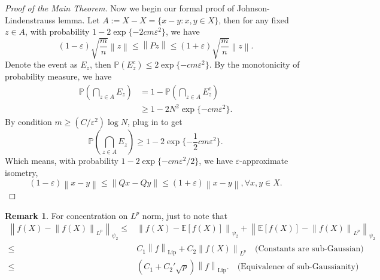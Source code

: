 \documentclass[9pt,onesided]{article}
\newcommand{\nm}[1]{\left\lVert#1\right\rVert}
\newcommand{\ex}[1]{\mathbb{E}[#1]}
\newcommand{\mc}{\color{BlueViolet}}
\renewcommand{\ge}{\geqslant}
\renewcommand{\le}{\leqslant}
\newcommand{\p}{\mathbb{P}}
\theoremstyle{definition}
\newtheorem*{remark}{\mc Remark}
\begin{document}
\begin{proof}
    [Proof of the Main Theorem] Now we begin our formal proof of Johnson-Lindenstrauss lemma. Let $A:= X-X=\{x-y:x,y\in X\}$, then for any fixed $z\in A$, with probability $1-2\exp\{-2cm\varepsilon^2\}$,  we have 
    \begin{equation*}
         (1-\varepsilon)\sqrt{\frac{m}{n}}\nm{z}\le \nm{Pz}\le   (1+\varepsilon)\sqrt{\frac{m}{n}}\nm{z}.
    \end{equation*}
    Denote the event as $E_z$, then $\p(E_z^c)\le2\exp\{-cm\varepsilon^2\}$. By the monotonicity of probability measure, we have
    \begin{align*}
         \p(\bigcap_{z\in A} E_z) &= 1- \p(\bigcap_{z\in A }E_z^c)\\
&\ge 1-2N^2 \exp\{-cm\varepsilon^2\}.
    \end{align*}
    By condition $m\ge (C/\varepsilon^2)\log N$, plug in to get
    \begin{equation*}
        \p( \bigcap_{z\in A}E_z)\ge 1- 2\exp\{-\frac{1}{2}cm\varepsilon^2\}.
    \end{equation*}
    Which means, with probability $1-2\exp\{-cm\varepsilon^2/2\}$, we have $\varepsilon$-approximate isometry, 
    \begin{equation*}
         (1-\varepsilon)\nm{x-y}\le \nm{Qx-Qy}\le (1+\varepsilon)\nm{x-y}, \forall x,y\in X. 
    \end{equation*}
\end{proof}
 
\begin{remark}
For concentration on $L^p$ norm, just to note that 
\begin{align*}
\nm{f(X)- \nm{f(X)}_{L^p}}_{\psi_2}\le& \nm{f(X)-\ex{f(X)}}_{\psi_2} +\nm{ \ex{f(X)}- \nm{ f(X)}_{L^p}}_{\psi_2}\\
\le &C_1 \nm{f}_{\mathrm{Lip}}+C_2\nm{f(X)}_{L^p}\quad \text{(Constants are sub-Gaussian)}\\
\le &(C_1 +C_2' \sqrt{p}) \nm{f}_{\mathrm{Lip}}.\quad \text{(Equivalence of sub-Gaussianity)}
\end{align*}
\end{remark}
\end{document}
